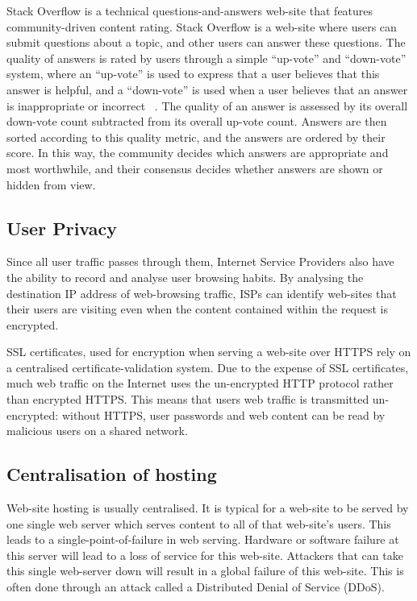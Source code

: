 Stack Overflow is a technical questions-and-answers web-site that features
community-driven content rating. Stack Overflow is a web-site where users can submit
questions about a topic, and other users can answer these questions. The quality
of answers is rated by users through a simple ``up-vote'' and ``down-vote'' system, where an
``up-vote'' is used to express that a user believes that this answer is helpful,
and a ``down-vote'' is used when a user believes that an answer is inappropriate or incorrect
~\cite{stackoverflow}.
The quality of an answer is assessed by its overall down-vote count subtracted
from its overall up-vote count. Answers are then sorted according to this
quality metric, and the answers are ordered by their score. In this way, the
community decides which answers are appropriate and most worthwhile, and their
consensus decides whether answers are shown or hidden from view.

\subsection{User Privacy}

Since all user traffic passes through them, Internet Service Providers also have
the ability to record and analyse user browsing habits. By analysing the destination
IP address of web-browsing traffic, ISPs can identify web-sites
that their users are visiting even when the content contained within the request is
encrypted.

SSL certificates, used for encryption when serving a web-site over HTTPS rely on a
centralised certificate-validation system. Due to the expense of SSL certificates,
much web traffic on the Internet uses the un-encrypted HTTP protocol rather than
encrypted HTTPS. This means that users web traffic is transmitted un-encrypted: without
HTTPS, user passwords and web content can be read by malicious users on a shared network.

\subsection{Centralisation of hosting}

Web-site hosting is usually centralised. It is typical for a web-site to be served by
one single web server which serves content to all of that web-site's users. This leads
to a single-point-of-failure in web serving. Hardware or software failure at this server
will lead to a loss of service for this web-site. Attackers that can take this single web-server
down will result in a global failure of this web-site. This is often done through an attack
called a Distributed Denial of Service (DDoS).

